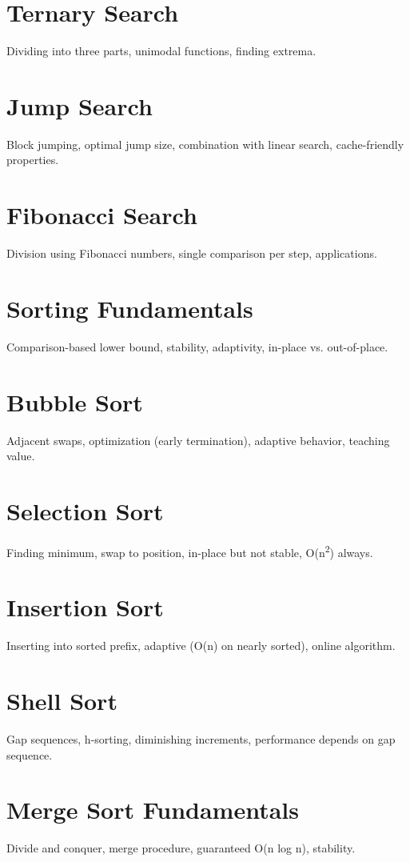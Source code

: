 \chapter{Ternary Search}
Dividing into three parts, unimodal functions, finding extrema.

\chapter{Jump Search}
Block jumping, optimal jump size, combination with linear search, cache-friendly properties.

\chapter{Fibonacci Search}
Division using Fibonacci numbers, single comparison per step, applications.

\chapter{Sorting Fundamentals}
Comparison-based lower bound, stability, adaptivity, in-place vs. out-of-place.

\chapter{Bubble Sort}
Adjacent swaps, optimization (early termination), adaptive behavior, teaching value.

\chapter{Selection Sort}
Finding minimum, swap to position, in-place but not stable, O(n\textsuperscript{2}) always.

\chapter{Insertion Sort}
Inserting into sorted prefix, adaptive (O(n) on nearly sorted), online algorithm.

\chapter{Shell Sort}
Gap sequences, h-sorting, diminishing increments, performance depends on gap sequence.

\chapter{Merge Sort Fundamentals}
Divide and conquer, merge procedure, guaranteed O(n log n), stability.

